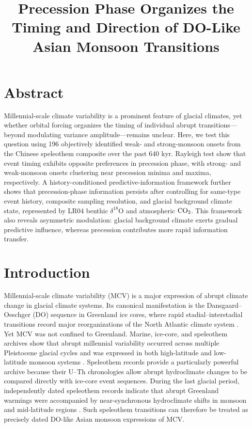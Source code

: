 \documentclass[11pt]{article}
\title{Precession Phase Organizes the Timing and Direction of DO-Like Asian Monsoon Transitions}
\author{}
\date{}
\begin{document}
\maketitle

\section*{Abstract}

Millennial-scale climate variability is a prominent feature of glacial climates, yet whether orbital forcing organizes the timing of individual abrupt transitions---beyond modulating variance amplitude---remains unclear. Here, we test this question using 196 objectively identified weak- and strong-monsoon onsets from the Chinese speleothem composite over the past 640 kyr. Rayleigh test show that event timing exhibits opposite preferences in precession phase, with strong- and weak-monsoon onsets clustering near precession minima and maxima, respectively. A history-conditioned predictive-information framework further shows that precession-phase information persists after controlling for same-type event history, composite sampling resolution, and glacial background climate state, represented by LR04 benthic \(\delta^{18}\mathrm{O}\) and atmospheric \(\ce{CO2}\). This framework also reveals asymmetric modulation: glacial background climate exerts gradual predictive influence, whereas precession contributes more rapid information transfer.

\section*{Introduction}

Millennial-scale climate variability (MCV) is a major expression of abrupt climate change in glacial climate systems. Its canonical manifestation is the Dansgaard--Oeschger (DO) sequence in Greenland ice cores, where rapid stadial--interstadial transitions record major reorganizations of the North Atlantic climate system \citep{rasmussen2014stratigraphic}. Yet MCV was not confined to Greenland. Marine, ice-core, and speleothem archives show that abrupt millennial variability occurred across multiple Pleistocene glacial cycles and was expressed in both high-latitude and low-latitude monsoon systems \citep{barker2011800, sun2021persistent, hodell20231}. Speleothem records provide a particularly powerful archive because their U--Th chronologies allow abrupt hydroclimate changes to be compared directly with ice-core event sequences. During the last glacial period, independently dated speleothem records indicate that abrupt Greenland warmings were accompanied by near-synchronous hydroclimate shifts in monsoon and mid-latitude regions \citep{corrick2020synchronous}. Such speleothem transitions can therefore be treated as precisely dated DO-like Asian monsoon expressions of MCV.
\end{document}
